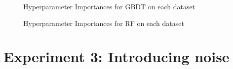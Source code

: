 \begin{figure}[h]
	\centering
	\caption{Hyperparameter Importances for GBDT on each dataset}
	\label{fig:GBDT_HPO_Crafted}
\end{figure}
\begin{figure}[h]
	\centering
	\caption{Hyperparameter Importances for RF on each dataset}
	\label{fig:GBDT_HPO_Crafted}
\end{figure}

\section{Experiment 3: Introducing noise}








